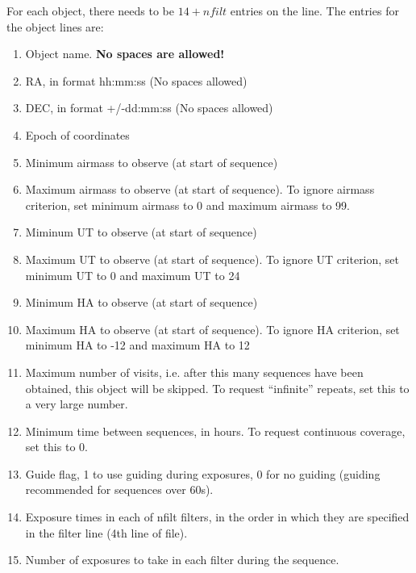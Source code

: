 For each object, there needs to be $14+nfilt$ entries on the line. The 
entries for the object lines are:
\begin{enumerate}
  \item Object name. \textbf{No spaces are allowed!}
  \item RA, in format hh:mm:ss (No spaces allowed)
  \item DEC, in format +/-dd:mm:ss (No spaces allowed)
  \item Epoch of coordinates
  \item Minimum airmass to observe (at start of sequence)
  \item Maximum airmass to observe (at start of sequence). To ignore 
     airmass criterion, set minimum airmass to 0 and maximum airmass to 99.
  \item Miminum UT to observe (at start of sequence)
  \item Maximum UT to observe (at start of sequence). To ignore UT criterion,
     set minimum UT to 0 and maximum UT to 24
  \item Minimum HA to observe (at start of sequence)
  \item Maximum HA to observe (at start of sequence). To ignore HA criterion,
     set minimum HA to -12 and maximum HA to 12
  \item Maximum number of visits, i.e. after this many sequences have been
     obtained, this object will be skipped. To request ``infinite'' repeats,
     set this to a very large number.
  \item Minimum time between sequences, in hours. To request continuous
     coverage, set this to 0.
  \item Guide flag, 1 to use guiding during exposures, 0 for no guiding
     (guiding recommended for sequences over 60s).
  \item Exposure times in each of nfilt filters, in the order in which
     they are specified in the filter line (4th line of file). 
  \item Number of exposures to take in each filter during the sequence.
\end{enumerate}

